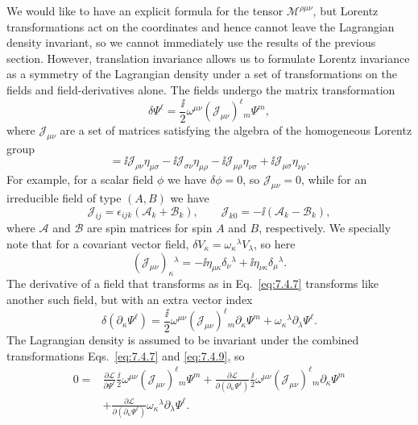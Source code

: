 We would like to have an explicit formula for the tensor
$\mathcal{M}^{\rho\mu\nu}$, but Lorentz transformations act on the coordinates
and hence cannot leave the Lagrangian density invariant, so we cannot
immediately use the results of the previous section. However, translation
invariance allows us to formulate Lorentz invariance as a symmetry of the
Lagrangian density under a set of transformations on the fields and
field-derivatives alone. The fields undergo the matrix transformation
\begin{equation}
\delta\Psi^\ell=\frac{\ii}{2}\omega^{\mu\nu}
(\mathcal{J}_{\mu\nu})^\ell{}_m\Psi^m,
\tag{7.4.7}\label{eq:7.4.7}
\end{equation}
where $\mathcal{J}_{\mu\nu}$ are a set of matrices satisfying the algebra of the
homogeneous Lorentz group
\begin{equation}
[\mathcal{J}_{\mu\nu},\mathcal{J}_{\rho\sigma}]
=\ii\mathcal{J}_{\rho\nu}\eta_{\mu\sigma}
-\ii\mathcal{J}_{\sigma\nu}\eta_{\mu\rho}
-\ii\mathcal{J}_{\mu\rho}\eta_{\nu\sigma}
+\ii\mathcal{J}_{\mu\sigma}\eta_{\nu\rho}.
\tag{7.4.8}\label{eq:7.4.8}
\end{equation}
For example, for a scalar field $\phi$ we have $\delta\phi=0$, so
$\mathcal{J}_{\mu\nu}=0$, while for an irreducible field of type $(A,B)$ we have
\[
\mathcal{J}_{ij}=\epsilon_{ijk}(\mathcal{A}_k+\mathcal{B}_k),
\qquad
\mathcal{J}_{k0}=-\ii(\mathcal{A}_k-\mathcal{B}_k),
\]
where $\mathcal{A}$ and $\mathcal{B}$ are spin matrices for spin $A$ and $B$,
respectively. We specially note that for a covariant vector field,
$\delta V_\kappa=\omega_\kappa{}^\lambda V_\lambda$, so here
\[
(\mathcal{J}_{\mu\nu})_\kappa{}^\lambda
=-\ii\eta_{\mu\kappa}\delta_\nu{}^\lambda
+\ii\eta_{\nu\kappa}\delta_\mu{}^\lambda.
\]
The derivative of a field that transforms as in Eq.~\eqref{eq:7.4.7} transforms like
another such field, but with an extra vector index
\begin{equation}
\delta(\partial_\kappa\Psi^\ell)
=\frac{\ii}{2}\omega^{\mu\nu}(\mathcal{J}_{\mu\nu})^\ell{}_m
\partial_\kappa\Psi^m
+\omega_\kappa{}^\lambda\partial_\lambda\Psi^\ell.
\tag{7.4.9}\label{eq:7.4.9}
\end{equation}
The Lagrangian density is assumed to be invariant under the combined
transformations Eqs.~\eqref{eq:7.4.7} and \eqref{eq:7.4.9}, so
\begin{align*}
0={}&\frac{\partial\mathcal{L}}{\partial\Psi^\ell}
\frac{\ii}{2}\omega^{\mu\nu}(\mathcal{J}_{\mu\nu})^\ell{}_m\Psi^m
+\frac{\partial\mathcal{L}}{\partial(\partial_\kappa\Psi^\ell)}
\frac{\ii}{2}\omega^{\mu\nu}(\mathcal{J}_{\mu\nu})^\ell{}_m
\partial_\kappa\Psi^m\\
&+\frac{\partial\mathcal{L}}{\partial(\partial_\kappa\Psi^\ell)}
\omega_\kappa{}^\lambda\partial_\lambda\Psi^\ell.
\end{align*}
